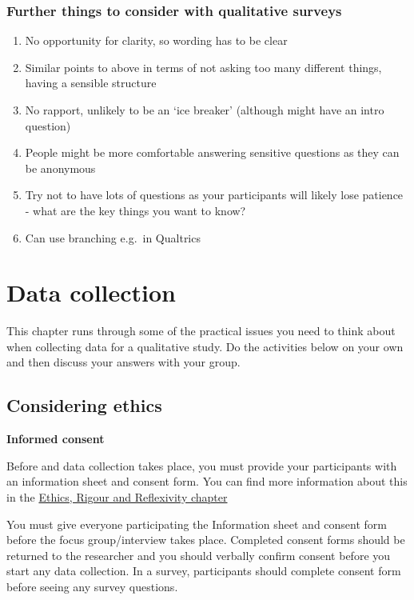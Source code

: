 \documentclass[
  english,
  letterpaper,
  DIV=11,
  numbers=noendperiod]{scrreprt}
\providecommand{\tightlist}{%
  \setlength{\itemsep}{0pt}\setlength{\parskip}{0pt}}
\begin{document}
\subsection{Further things to consider with qualitative
surveys}\label{further-things-to-consider-with-qualitative-surveys}

\begin{enumerate}
\def\labelenumi{\arabic{enumi}.}
\tightlist
\item
  No opportunity for clarity, so wording has to be clear
\item
  Similar points to above in terms of not asking too many different
  things, having a sensible structure
\item
  No rapport, unlikely to be an `ice breaker' (although might have an
  intro question)
\item
  People might be more comfortable answering sensitive questions as they
  can be anonymous
\item
  Try not to have lots of questions as your participants will likely
  lose patience - what are the key things you want to know?
\item
  Can use branching e.g.~in Qualtrics
\end{enumerate}

\chapter{Data collection}\label{ch7_data_collection}

This chapter runs through some of the practical issues you need to think
about when collecting data for a qualitative study. Do the activities
below on your own and then discuss your answers with your group.

\section{Considering ethics}\label{considering-ethics}

\textbf{Informed consent}

Before and data collection takes place, you must provide your
participants with an information sheet and consent form. You can find
more information about this in the \hyperref[ch9_ethics]{Ethics, Rigour
and Reflexivity chapter}

You must give everyone participating the Information sheet and consent
form before the focus group/interview takes place. Completed consent
forms should be returned to the researcher and you should verbally
confirm consent before you start any data collection. In a survey,
participants should complete consent form before seeing any survey
questions.
\end{document}
